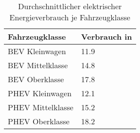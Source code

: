 {
\renewcommand{\arraystretch}{1.2}%
\begin{table}[H]
	\begin{center}
		\caption{Durchschnittlicher elektrischer Energieverbrauch je Fahrzeugklasse}
		\begin{tabu} to 0.55\textwidth {X[1] X[1.4, r]}
			\toprule
			Fahrzeugklasse    & Verbrauch in \si{\kwhkm} \\ \midrule
			BEV Kleinwagen    & \num{11.9}              \\
			BEV Mittelklasse  & \num{14.8}              \\
			BEV Oberklasse    & \num{17.8}              \\
			PHEV Kleinwagen   & \num{12.1}              \\
			PHEV Mittelklasse & \num{15.2}              \\
			PHEV Oberklasse   & \num{18.2}              \\ \bottomrule
		\end{tabu}
		\label{tab:TechVerbrauch}
	\end{center}
	\vspace{-3mm}%
\end{table}
}